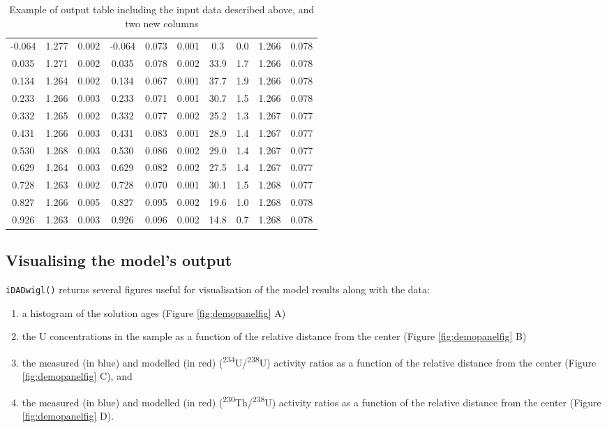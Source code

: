 \documentclass[]{elsarticle} %
\providecommand{\tightlist}{%
  \setlength{\itemsep}{0pt}\setlength{\parskip}{0pt}}
\begin{document}
\begin{table}[ht]
\begin{tabular}{cccccccccc}
  -0.064 & 1.277 & 0.002 & -0.064 & 0.073 & 0.001 & 0.3 & 0.0 & 1.266 & 0.078 \\ 
  0.035 & 1.271 & 0.002 & 0.035 & 0.078 & 0.002 & 33.9 & 1.7 & 1.266 & 0.078 \\ 
  0.134 & 1.264 & 0.002 & 0.134 & 0.067 & 0.001 & 37.7 & 1.9 & 1.266 & 0.078 \\ 
  0.233 & 1.266 & 0.003 & 0.233 & 0.071 & 0.001 & 30.7 & 1.5 & 1.266 & 0.078 \\ 
  0.332 & 1.265 & 0.002 & 0.332 & 0.077 & 0.002 & 25.2 & 1.3 & 1.267 & 0.077 \\ 
  0.431 & 1.266 & 0.003 & 0.431 & 0.083 & 0.001 & 28.9 & 1.4 & 1.267 & 0.077 \\ 
  0.530 & 1.268 & 0.003 & 0.530 & 0.086 & 0.002 & 29.0 & 1.4 & 1.267 & 0.077 \\ 
  0.629 & 1.264 & 0.003 & 0.629 & 0.082 & 0.002 & 27.5 & 1.4 & 1.267 & 0.077 \\ 
  0.728 & 1.263 & 0.002 & 0.728 & 0.070 & 0.001 & 30.1 & 1.5 & 1.268 & 0.077 \\ 
  0.827 & 1.266 & 0.005 & 0.827 & 0.095 & 0.002 & 19.6 & 1.0 & 1.268 & 0.078 \\ 
  0.926 & 1.263 & 0.003 & 0.926 & 0.096 & 0.002 & 14.8 & 0.7 & 1.268 & 0.078 \\ 
   \hline
\end{tabular}
\caption{\label{tab:outputdata}Example of output table including the input data described above, and two new columns} 
\end{table}

\newpage

\hypertarget{visualising-the-models-output}{%
\subsection{Visualising the model's output}\label{visualising-the-models-output}}

\texttt{iDADwigl()} returns several figures useful for visualisation of the model results along with the data:

\begin{enumerate}
\def\labelenumi{\arabic{enumi}.}
\tightlist
\item
  a histogram of the solution ages (Figure \ref{fig:demopanelfig} A)
\item
  the U concentrations in the sample as a function of the relative distance from the center (Figure \ref{fig:demopanelfig} B)
\item
  the measured (in blue) and modelled (in red) (\textsuperscript{234}U/\textsuperscript{238}U) activity ratios as a function of the relative distance from the center (Figure \ref{fig:demopanelfig} C), and
\item
  the measured (in blue) and modelled (in red) (\textsuperscript{230}Th/\textsuperscript{238}U) activity ratios as a function of the relative distance from the center (Figure \ref{fig:demopanelfig} D).
\end{enumerate}
\end{document}
